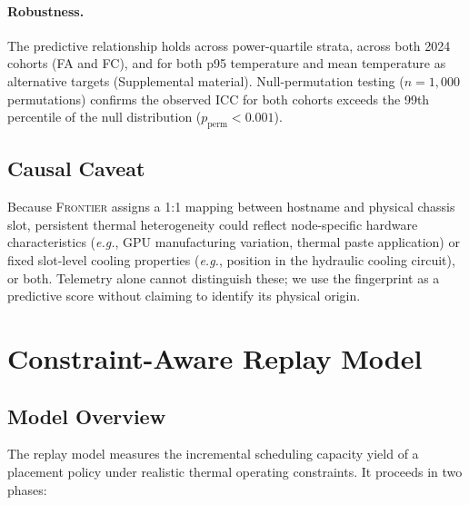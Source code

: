 \documentclass[acmsmall,screen,review,anonymous]{acmart}
\newcommand{\Frontier}{\textsc{Frontier}\xspace}
\newcommand{\eg}{\textit{e.g.},\xspace}
\begin{document}
\paragraph{Robustness.}
The predictive relationship holds across power-quartile strata, across both 2024 cohorts
(FA and FC), and for both p95 temperature and mean temperature as alternative targets
(Supplemental material).  Null-permutation testing ($n=1,000$ permutations) confirms
the observed ICC for both cohorts exceeds the 99th percentile of the null distribution
($p_{\mathrm{perm}} < 0.001$).


\subsection{Causal Caveat}

Because \Frontier assigns a 1:1 mapping between hostname and physical chassis slot,
persistent thermal heterogeneity could reflect node-specific hardware characteristics
(\eg GPU manufacturing variation, thermal paste application) or fixed slot-level
cooling properties (\eg position in the hydraulic cooling circuit), or both.  Telemetry
alone cannot distinguish these; we use the fingerprint as a predictive score without
claiming to identify its physical origin.

\section{Constraint-Aware Replay Model}
\label{sec:model}

\subsection{Model Overview}

The replay model measures the incremental scheduling capacity yield of a placement
policy under realistic thermal operating constraints.  It proceeds in two phases:
\end{document}
